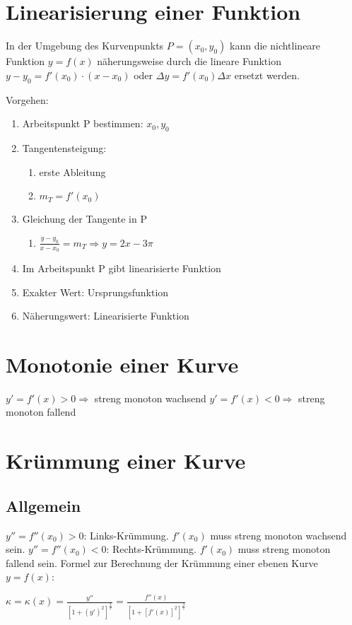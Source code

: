 \section{Linearisierung einer Funktion}
In der Umgebung des Kurvenpunkts \(P=(x_0,y_0)\) kann die nichtlineare Funktion \(y=f(x)\) näherungsweise durch die lineare Funktion\newline
\(y - y_0 = f'(x_0) \cdot (x - x_0) \) oder \( \Delta y = f'(x_0)\Delta x \)\newline
ersetzt werden.

\par Vorgehen: 
\begin{enumerate}
	\item Arbeitspunkt P bestimmen: \(x_0, y_0\)
	\item Tangentensteigung:
	\begin{enumerate}
		\item erste Ableitung
		\item \(m_T = f'(x_0)\)
	\end{enumerate}
	\item Gleichung der Tangente in P
	\begin{enumerate}
		\item \(\frac{y-y_0}{x-x_0} = m_T  \Rightarrow y = 2x-3\pi  \)
	\end{enumerate}
	\item Im Arbeitspunkt P gibt linearisierte Funktion
	\item Exakter Wert: Ursprungsfunktion
	\item Näherungswert: Linearisierte Funktion
\end{enumerate}

\section{Monotonie einer Kurve} %
\label{sec:monotonie_einer_kurve}
\( y' = f'(x) > 0 \Rightarrow \) streng monoton wachsend\newline
\( y' = f'(x) < 0 \Rightarrow \) streng monoton fallend

\section{Krümmung einer Kurve} %
\label{sec:krümmung_einer_kurve}
\subsection{Allgemein} %
\label{sub:allgemein}
\( y'' = f''(x_0) > 0 \): Links-Krümmung. \( f'(x_0) \) muss streng monoton wachsend sein. \newline
\( y'' = f''(x_0) < 0 \): Rechts-Krümmung. \( f'(x_0) \) muss streng monoton fallend sein. \newline
Formel zur Berechnung der Krümmung einer ebenen Kurve \(y=f(x)\):\par
\( \kappa = \kappa (x) = \frac{y''}{[1+(y')^2]^{\frac{3}{2}}} = \frac{f''(x)}{[1+[f'(x)]^2]^{\frac{3}{2}}} \)
